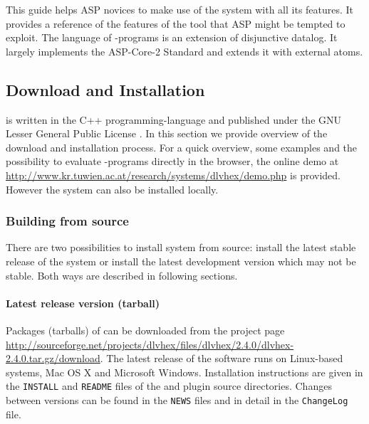 \documentclass[14pt,a4paper, titlepage]{article}
\begin{document}
This guide helps ASP novices to make use of the system with all its features. It provides a reference of the features of the tool that ASP might be tempted to exploit. The language of \hex{}-programs is an extension of disjunctive datalog. It largely implements the ASP-Core-2 Standard \cite{ref} and extends it with external atoms. 


\subsection{Download and Installation}
\dlvhex{} is written in the C++ programming-language and published under the GNU Lesser General Public License \cite{licnc}. In this section we provide overview of the download and installation process. For a quick overview, some examples and the possibility to evaluate \hex{}-programs directly in the browser, the online demo at \url{http://www.kr.tuwien.ac.at/research/systems/dlvhex/demo.php} is provided. However the system can also be installed locally. 

\subsubsection{Building from source}
There are two possibilities to install \dlvhex{} system from source: install the latest stable release of the system or install the latest development version which may not be stable. Both ways are described in following sections.  

\paragraph{Latest release version (tarball)}
Packages (tarballs) of \dlvhex{} can be downloaded from the project page \url{http://sourceforge.net/projects/dlvhex/files/dlvhex/2.4.0/dlvhex-2.4.0.tar.gz/download}. The latest release of the software runs on Linux-based systems, Mac OS X and Microsoft Windows. Installation instructions are given in the {\tt INSTALL} and {\tt README} files of the \dlvhex{} and plugin source directories. Changes between versions can be found in the {\tt NEWS} files and in detail in the {\tt ChangeLog} file. 
\end{document}

